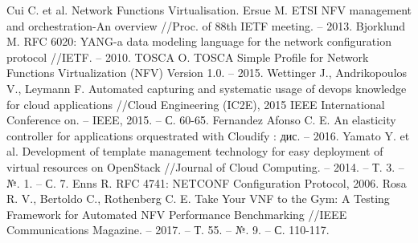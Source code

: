\documentclass[oneside,final,14pt,a4paper]{extreport}
\begin{document}
\begin{thebibliography}{00}
 Cui C. et al. Network Functions Virtualisation.
 Ersue M. ETSI NFV management and orchestration-An overview //Proc. of 88th IETF meeting. – 2013.
 Bjorklund M. RFC 6020: YANG-a data modeling language for the network configuration protocol //IETF. – 2010.
 TOSCA O. TOSCA Simple Profile for Network Functions Virtualization (NFV) Version 1.0. – 2015.
 Wettinger J., Andrikopoulos V., Leymann F. Automated capturing and systematic usage of devops knowledge for cloud applications //Cloud Engineering (IC2E), 2015 IEEE International Conference on. – IEEE, 2015. – С. 60-65.
 Fernandez Afonso C. E. An elasticity controller for applications orquestrated with Cloudify : дис. – 2016.
 Yamato Y. et al. Development of template management technology for easy deployment of virtual resources on OpenStack //Journal of Cloud Computing. – 2014. – Т. 3. – №. 1. – С. 7.
 Enns R. RFC 4741: NETCONF Configuration Protocol, 2006.
 Rosa R. V., Bertoldo C., Rothenberg C. E. Take Your VNF to the Gym: A Testing Framework for Automated NFV Performance Benchmarking //IEEE Communications Magazine. – 2017. – Т. 55. – №. 9. – С. 110-117.




\end{thebibliography}
\end{document}
